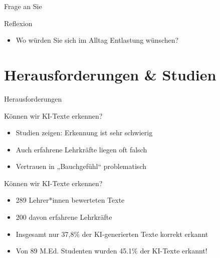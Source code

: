 \documentclass[14pt, aspectratio=169]{beamer}
\begin{document}
\begin{frame}{Frage an Sie}
\begin{block}{Reflexion}
\begin{itemize}
    \item Wo würden Sie sich im Alltag Entlastung wünschen?
\end{itemize}
\end{block}
\end{frame}


\section{Herausforderungen \& Studien}

\begin{frame}{}
\begin{center}
    \Large Herausforderungen
\end{center}
\end{frame}

\begin{frame}{Können wir KI-Texte erkennen?}
\begin{itemize}
    \item Studien zeigen: Erkennung ist sehr schwierig
    \item Auch erfahrene Lehrkräfte liegen oft falsch
    \item Vertrauen in „Bauchgefühl“ problematisch
\end{itemize}
\end{frame}

\begin{frame}{Können wir KI-Texte erkennen?}
\begin{itemize}
    \item 289 Lehrer*innen bewerteten Texte
    \item 200 davon erfahrene Lehrkräfte
    \item Insgesamt nur 37,8\% der KI-generierten Texte korrekt erkannt
    \item Von 89 M.Ed. Studenten wurden 45.1\% der KI-Texte erkannt!
\end{itemize}
\begin{center}
\begin{tiny}
    \autocite[4f.]{fleckenstein_teachers_2024}
\end{tiny}
\end{center}
\end{frame}
\end{document}
